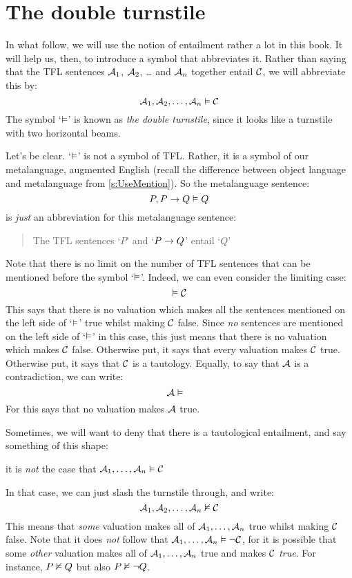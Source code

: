 \section{The double turnstile}
In what follow, we will use the notion of entailment rather a lot in this book. It will help us, then, to introduce a symbol that abbreviates it. Rather than saying that the TFL sentences $\mathcal{A}_1$, $\mathcal{A}_2$, \dots{} and $\mathcal{A}_n$ together entail $\mathcal{C}$, we will abbreviate this by:
	$$\mathcal{A}_1, \mathcal{A}_2, \dots, \mathcal{A}_n \vDash \mathcal{C}$$
The symbol `$\vDash$' is known as \emph{the double turnstile}, since it looks like a turnstile with two horizontal beams.

Let's be clear. `$\vDash$' is not a symbol of TFL. Rather, it is a symbol of our metalanguage, augmented English (recall the difference between object language and metalanguage from \cref{s:UseMention}). So the metalanguage sentence:
	\[P, P \rightarrow Q \vDash Q\]
is \emph{just} an abbreviation for this metalanguage sentence: 
	\begin{quote}
		\item The TFL sentences `$P$' and `$P \rightarrow Q$' entail `$Q$'
	\end{quote}
Note that there is no limit on the number of TFL sentences that can be mentioned before the symbol `$\vDash$'. Indeed, we can even consider the limiting case:
	$$\vDash \mathcal{C}$$
This says that there is no valuation which makes all the sentences mentioned on the left side of `$\vDash$' true whilst making $\mathcal{C}$ false. Since \emph{no} sentences are mentioned on the left side of `$\vDash$' in this case, this just means that there is no valuation which makes $\mathcal{C}$ false. Otherwise put, it says that every valuation makes $\mathcal{C}$ true. Otherwise put, it says that $\mathcal{C}$ is a tautology. Equally, to say that $\mathcal{A}$ is a contradiction, we can write:
	$$\metav{A} \entails\phantom{\metav{C}}$$
For this says that no valuation makes $\mathcal{A}$ true.

Sometimes, we will want to deny that there is a tautological entailment, and say something of this shape: 
\begin{center}
	it is \emph{not} the case that $\mathcal{A}_1, \ldots, \mathcal{A}_n \vDash \mathcal{C}$
\end{center}
In that case, we can just slash the turnstile through, and write: 
$$\mathcal{A}_1, \mathcal{A}_2, \ldots, \mathcal{A}_n \nvDash\mathcal{C}$$
This means that \emph{some} valuation makes all of $\mathcal{A}_1,
\ldots, \mathcal{A}_n$ true whilst making $\mathcal{C}$ false. Note that
it does \emph{not} follow that $\mathcal{A}_1,\ldots, \mathcal{A}_n
\vDash \neg \mathcal{C}$, for it is possible that some \emph{other}
valuation makes all of $\mathcal{A}_1, \ldots, \mathcal{A}_n$ true and
makes $\mathcal{C}$ \emph{true}. For instance, $P \nvDash Q$ but also
$P \nvDash \neg Q$.

